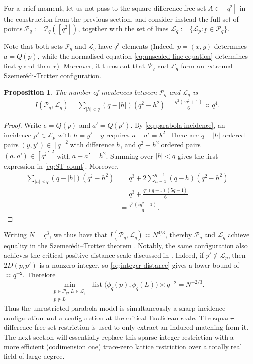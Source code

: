 \documentclass[11pt,reqno]{amsart}
\newtheorem{proposition}[proposition]{Proposition}
\theoremstyle{definition}
\theoremstyle{remark}
\newcommand{\dist}{\operatorname{dist}}
\begin{document}
For a brief moment, let us not pass to the square-difference-free set $A \subset [q^2]$ in the construction from the previous section, and consider instead the full set of points $\mathcal P_q:=\mathcal P_q([q^2])$, together with the set of lines $\mathcal L_q:=\{\mathcal L_p:p\in\mathcal P_q\}$.

Note that both sets $\mathcal P_q$ and $\mathcal L_q$ have $q^3$ elements (Indeed, $p=(x,y)$ determines
$a=Q(p)$, while the normalised equation
\eqref{eq:unscaled-line-equation} determines first $y$ and then $x$). Moreover, it turns out that $\mathcal P_{q}$ and $\mathcal L_{q}$ form an extremal Szemer\'edi-Trotter configuration.

\begin{proposition}
\label{prop:ST-grid}
The number of incidences between $\mathcal P_q$ and $\mathcal L_q$ is
\begin{equation}
\label{eq:ST-count}
\begin{aligned}
        I(\mathcal P_q,\mathcal L_q)=\sum_{|h|<q}(q-|h|)(q^2-h^2)=\frac{q^2(5q^2+1)}6
        \asymp q^4.
\end{aligned}
\end{equation}
\end{proposition}

\begin{proof}
Write $a=Q(p)$ and $a'=Q(p')$.  By
\eqref{eq:parabola-incidence}, an incidence $p'\in\mathcal L_p$ with
$h=y'-y$ requires $a-a'=h^2$.  There are $q-|h|$ ordered pairs
$(y,y')\in[q]^2$ with difference $h$, and $q^2-h^2$ ordered pairs
$(a,a')\in[q^2]^2$ with $a-a'=h^2$.  Summing over $|h|<q$ gives the
first expression in \eqref{eq:ST-count}.  Moreover,
\[
\begin{aligned}
        \sum_{|h|<q}(q-|h|)(q^2-h^2)
        &=q^3+2\sum_{h=1}^{q-1}(q-h)(q^2-h^2)\\
        &=q^3+\frac{q^2(q-1)(5q-1)}6\\
        &=\frac{q^2(5q^2+1)}6.
\end{aligned}
\]
\end{proof}

Writing $N=q^3$, we thus have that $I(\mathcal P_q,\mathcal L_q) \asymp N^{4/3}$, thereby $\mathcal P_q$ and $\mathcal L_q$ achieve equality in the Szemer\'edi--Trotter theorem \cite{SzemerediTrotter1983}. Notably, the same configuration also achieves the critical
positive distance scale discussed in \cite[Section 3]{CPZ2023}. Indeed, if $p'\notin\mathcal L_p$, then
$2D(p,p')$ is a nonzero integer, so
\eqref{eq:integer-distance} gives a lower bound of $\asymp q^{-2}$. Therefore
\[
        \min_{\substack{p\in\mathcal P_q,\ L\in\mathcal L_q\\p\notin L}}
        \dist\bigl(\phi_q(p),\phi_q(L)\bigr)
        \asymp q^{-2}=N^{-2/3}.
\]
Thus the unrestricted parabola model is simultaneously a sharp
incidence configuration and a configuration at the critical Euclidean scale. The square-difference-free set restriction is used to only extract an induced matching from it. The next section will essentially replace this sparse integer restriction with a more efficient (codimension one) trace-zero lattice restriction over a totally real field of large degree.
\end{document}
